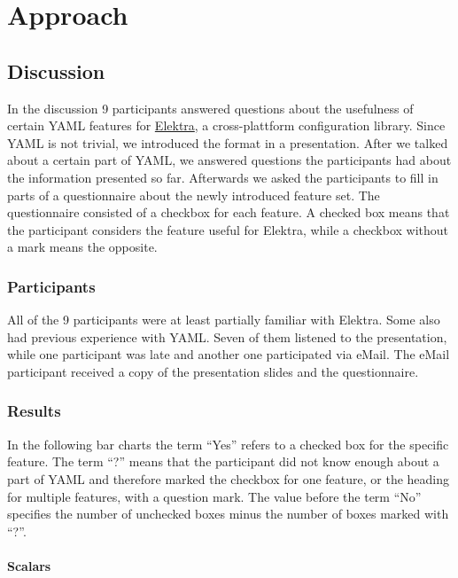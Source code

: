 \chapter{Approach}

\section{Discussion}

In the discussion 9 participants answered questions about the usefulness of certain YAML features for \href{https://www.libelektra.org}{Elektra}, a cross-plattform configuration library. Since YAML is not trivial, we introduced the format in a presentation. After we talked about a certain part of YAML, we answered questions the participants had about the information presented so far. Afterwards we asked the participants to fill in parts of a questionnaire about the newly introduced feature set. The questionnaire consisted of a checkbox for each feature. A checked box means that the participant considers the feature useful for Elektra, while a checkbox without a mark means the opposite.

\subsection{Participants}

All of the 9 participants were at least partially familiar with Elektra. Some also had previous experience with YAML. Seven of them listened to the presentation, while one participant was late and another one participated via eMail. The eMail participant received a copy of the presentation slides and the questionnaire.

\subsection{Results}

In the following bar charts the term “Yes” refers to a checked box for the specific feature. The term “?” means that the participant did not know enough about a part of YAML and therefore marked the checkbox for one feature, or the heading for multiple features, with a question mark. The value before the term “No” specifies the number of unchecked boxes minus the number of boxes marked with “?”.

\subsubsection{Scalars}

